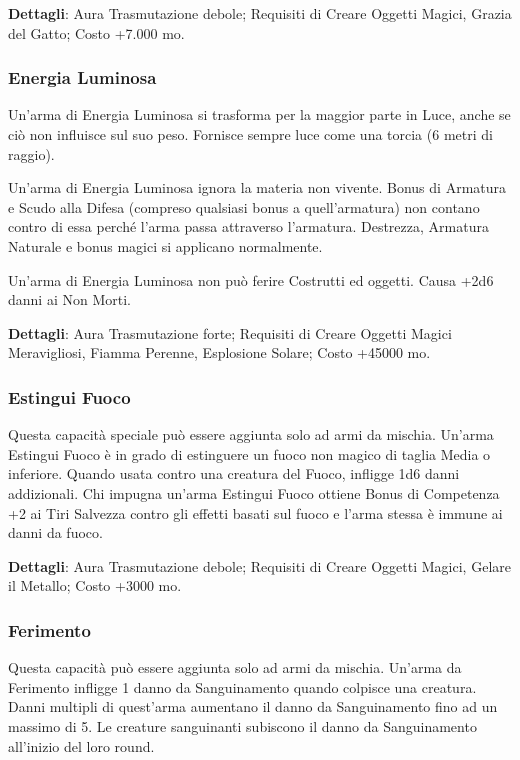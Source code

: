 \begin{multicols}{2}
\textbf{Dettagli}: Aura Trasmutazione debole; Requisiti di Creare Oggetti Magici, Grazia del Gatto; Costo +7.000 mo.

\subsubsection{Energia Luminosa}

Un'arma di Energia Luminosa si trasforma per la maggior parte in Luce, anche se ciò non influisce sul suo peso. Fornisce sempre luce come una torcia (6 metri di raggio).

Un'arma di Energia Luminosa ignora la materia non vivente. Bonus di Armatura e Scudo alla Difesa (compreso qualsiasi bonus a quell'armatura) non contano contro di essa perché l'arma passa attraverso l'armatura.
Destrezza, Armatura Naturale e bonus magici si applicano normalmente.

Un'arma di Energia Luminosa non può ferire Costrutti ed oggetti. Causa +2d6 danni ai Non Morti.

\textbf{Dettagli}: Aura Trasmutazione forte; Requisiti di Creare Oggetti Magici Meravigliosi, Fiamma Perenne, Esplosione Solare; Costo +45000 mo.

\subsubsection{Estingui Fuoco}

Questa capacità speciale può essere aggiunta solo ad armi da mischia. Un'arma Estingui Fuoco è in grado di estinguere un fuoco non magico di taglia Media o inferiore. Quando usata contro una creatura del Fuoco, infligge 1d6 danni addizionali. Chi impugna un'arma Estingui Fuoco ottiene Bonus di Competenza +2 ai Tiri Salvezza contro gli effetti basati sul fuoco e l'arma stessa è immune ai danni da fuoco.

\textbf{Dettagli}: Aura Trasmutazione debole; Requisiti di Creare Oggetti Magici, Gelare il Metallo; Costo +3000 mo.

\subsubsection{Ferimento}

Questa capacità può essere aggiunta solo ad armi da mischia. Un'arma da Ferimento infligge 1 danno da Sanguinamento quando colpisce una creatura. Danni multipli di quest'arma aumentano il danno da Sanguinamento fino ad un massimo di 5.
Le creature sanguinanti subiscono il danno da Sanguinamento all'inizio del loro round.


\end{multicols}
